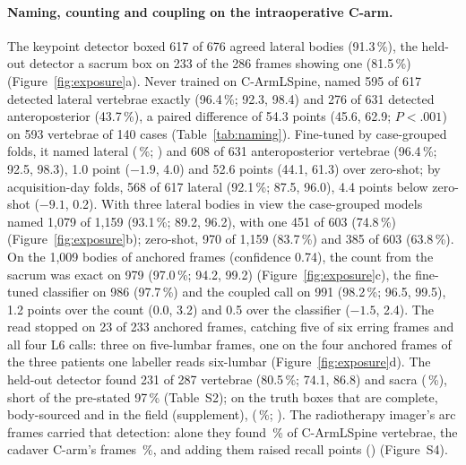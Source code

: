 \paragraph{Naming, counting and coupling on the intraoperative C-arm.}
The keypoint detector boxed 617 of 676 agreed lateral bodies (91.3\,\%), the held-out detector a sacrum box on 233
of the 286 frames showing one (81.5\,\%) (Figure~\ref{fig:exposure}a). Never trained on C-ArmLSpine, \netname{}
named 595 of 617 detected lateral vertebrae exactly (96.4\,\%; 92.3, 98.4) and 276 of 631 detected
anteroposterior (43.7\,\%), a paired difference of 54.3 points (45.6, 62.9; $P<.001$) on 593 vertebrae of 140 cases
(Table~\ref{tab:naming}). Fine-tuned by case-grouped folds, it named  lateral (\,\%; ) and
608 of 631 anteroposterior vertebrae (96.4\,\%; 92.5, 98.3), 1.0 point ($-1.9$, 4.0) and 52.6 points (44.1, 61.3)
over zero-shot; by acquisition-day folds, 568 of 617 lateral (92.1\,\%; 87.5, 96.0), 4.4 points below zero-shot
($-9.1$, 0.2). With three lateral bodies in view the case-grouped models named 1,079 of 1,159 (93.1\,\%; 89.2,
96.2), with one 451 of 603 (74.8\,\%) (Figure~\ref{fig:exposure}b); zero-shot, 970 of 1,159 (83.7\,\%) and 385 of 603
(63.8\,\%). On the 1,009 bodies of anchored frames (confidence 0.74), the count
from the sacrum was exact on 979 (97.0\,\%; 94.2, 99.2) (Figure~\ref{fig:exposure}c), the fine-tuned classifier on
986 (97.7\,\%) and the coupled call on 991 (98.2\,\%; 96.5, 99.5), 1.2 points over the count (0.0, 3.2) and 0.5
over the classifier ($-1.5$, 2.4). The read stopped on 23 of 233 anchored frames, catching five of
six erring frames and all four L6 calls: three on five-lumbar frames, one on the four anchored frames of the three
patients one labeller reads six-lumbar (Figure~\ref{fig:exposure}d).
The held-out detector found 231 of 287 vertebrae (80.5\,\%; 74.1, 86.8) and  sacra (\,\%), short of the
pre-stated 97\,\% (Table~S2); on the  truth boxes that are complete, body-sourced and in the
field (supplement),  (\,\%; ).
The radiotherapy imager's arc frames carried that detection: alone they found \,\% of
C-ArmLSpine vertebrae, the cadaver C-arm's frames \,\%, and adding them raised recall
 points () (Figure~S4).

